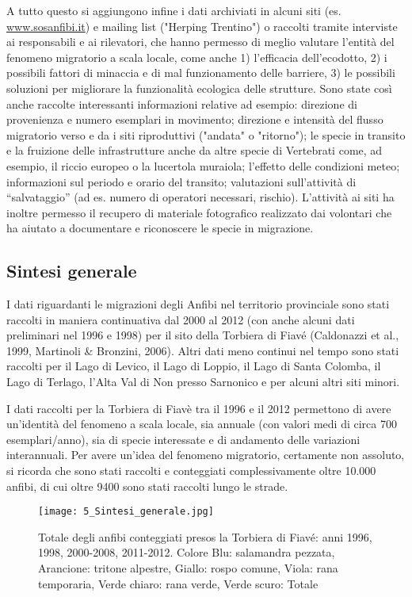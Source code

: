 \documentclass[11pt,a4paper,twoside]{memoir}
\begin{document}
A tutto questo si aggiungono infine i dati archiviati in alcuni siti (es. \url{www.sosanfibi.it}) e mailing list ("Herping Trentino") o raccolti tramite interviste ai responsabili e ai rilevatori, che hanno permesso di meglio valutare l’entità del fenomeno migratorio a scala locale, come anche 1) l’efficacia dell’ecodotto, 2) i possibili fattori di minaccia e di mal funzionamento delle barriere, 3) le possibili soluzioni per migliorare la funzionalità ecologica delle strutture. Sono state così anche raccolte interessanti informazioni relative ad esempio: direzione di provenienza e numero esemplari in movimento; direzione e intensità del flusso migratorio verso e da i siti riproduttivi ("andata" o "ritorno"); le specie in transito e la fruizione delle infrastrutture anche da altre specie di Vertebrati come, ad esempio, il riccio europeo o la lucertola muraiola; l’effetto  delle condizioni meteo; informazioni sul periodo e orario del transito; valutazioni sull’attività di “salvataggio” (ad es. numero di operatori necessari, rischio). L’attività ai siti ha inoltre permesso il recupero di materiale fotografico realizzato dai volontari che ha aiutato a documentare e riconoscere le specie in migrazione.

\subsection{Sintesi generale}
\label{subsec:statoanal_fenomig_sintesi}
I dati riguardanti le migrazioni degli Anfibi nel territorio provinciale sono stati raccolti in maniera continuativa dal 2000 al 2012 (con anche alcuni dati preliminari nel 1996 e 1998) per il sito della Torbiera di Fiavé (Caldonazzi et al., 1999, Martinoli \& Bronzini, 2006). Altri dati meno continui nel tempo sono stati raccolti per  il Lago di Levico, il Lago di Loppio, il Lago di Santa Colomba, il Lago di Terlago, l’Alta Val di Non presso Sarnonico e per alcuni altri siti minori.

I dati raccolti per la Torbiera di Fiavè tra il 1996 e il 2012 permettono di avere un’identità del fenomeno a scala locale, sia annuale (con valori medi di circa 700 esemplari/anno), sia di specie interessate e di andamento delle variazioni interannuali. Per avere un’idea del fenomeno migratorio, certamente non assoluto, si ricorda che sono stati raccolti e conteggiati complessivamente oltre 10.000 anfibi, di cui oltre 9400 sono stati raccolti lungo le strade.

\begin{figure}[H]
\label{fig:graph}
\centering
  \texttt{[image: 5\_Sintesi\_generale.jpg]}
\caption{Totale degli anfibi conteggiati presos la Torbiera di Fiavé: anni 1996, 1998, 2000-2008, 2011-2012. Colore Blu: salamandra pezzata, Arancione: tritone alpestre, Giallo: rospo comune, Viola: rana temporaria, Verde chiaro: rana verde, Verde scuro: Totale}
\end{figure}
\end{document}

